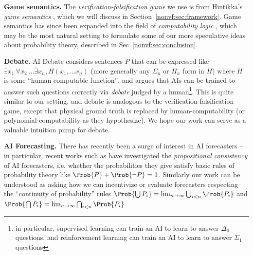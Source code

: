 \textbf{Game semantics.} The \emph{verification-falsification game} we use is from Hintikka's \emph{game semantics} \citep{hintikkaGameTheoreticSemantics1997}, which we will discuss in Section~\ref{nonvf:sec:framework}. Game semantics has since been expanded into the field of \emph{computability logic} \citep{japaridzeBeginningWasGame2009,japaridzeSurveyComputabilityLogic2015}, which may be the most natural setting to formulate some of our more speculative ideas about probability theory, described in Sec~\ref{nonvf:sec:conclusion}.

\textbf{Debate.} AI Debate \citep{irvingAISafetyDebate2018} considers sentences $P$ that can be expressed like $\exists x_1\ \forall x_2\ \dots \exists x_n,H(x_1,\dots x_n)$ (more generally any $\Sigma_n$ or $\Pi_n$ form in $H$) where $H$ is some ``human-computable function'', and argues that AIs can be trained to answer such questions correctly via \emph{debate} judged by a human\footnote{in particular, supervised learning can train an AI to learn to answer $\Delta_0$ questions, and reinforcement learning can train an AI to learn to answer $\Sigma_1$ questions}. This is quite similar to our setting, and debate is analogous to the verification-falsification game, except that physical ground truth is replaced by human-computability (or polynomial-computability as they hypothesize). We hope our work can serve as a valuable intuition pump for debate.

\textbf{AI Forecasting.} There has recently been a surge of interest in AI forecasters \citep{zouForecastingFutureWorld2022, schoeneggerLargeLanguageModel2023,yanAutoCastEnhancingWorld2023, halawiApproachingHumanLevelForecasting2024a, schoeneggerWisdomSiliconCrowd2024} -- in particular, recent works such as \citet{sudhirConsistencyChecksLanguage2024} have investigated the \emph{propositional consistency} of AI forecasters, i.e. whether the probabilities they give satisfy basic rules of probability theory like $\Prob{P}+\Prob{\lnot P}=1$. Similarly our work can be understood as asking how we can incentivize or evaluate forecasters respecting the ``continuity of probability'' rules $\Prob{\bigcup P_i}=\lim_{n\to\infty}\bigcup_{i<n}\Prob{P_i}$ and $\Prob{\bigcap P_i}=\lim_{n\to\infty}\bigcap_{i<n}\Prob{P_i}$.
